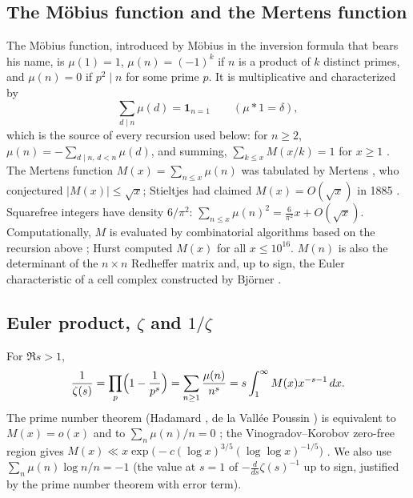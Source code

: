 \documentclass[11pt]{amsart}
\numberwithin{equation}{section}
\theoremstyle{plain}
\theoremstyle{definition}
\theoremstyle{remark}
\begin{document}
\subsection{The Möbius function and the Mertens function}
\label{subsec:intro-mobius}
The Möbius function, introduced by Möbius \cite{Mobius1832} in the
inversion formula that bears his name, is $\mu(1)=1$, $\mu(n)=(-1)^k$ if $n$
is a product of $k$ distinct primes, and $\mu(n)=0$ if $p^2\mid n$ for some
prime $p$. It is multiplicative and characterized by
\[
\sum_{d\mid n}\mu(d)=\mathbf 1_{n=1}\qquad(\mu*1=\delta),
\]
which is the source of every recursion used below: for $n\ge2$,
$\mu(n)=-\sum_{d\mid n,\,d<n}\mu(d)$, and summing,
$\sum_{k\le x}M(x/k)=1$ for $x\ge1$ \cite[\S3.2]{MontgomeryVaughan2007}.
The Mertens function $M(x)=\sum_{n\le x}\mu(n)$ was tabulated by Mertens
\cite{Mertens1897}, who conjectured $|M(x)|\le\sqrt x$; Stieltjes had
claimed $M(x)=O(\sqrt x)$ in 1885 \cite{Stieltjes1905}. Squarefree integers
have density $6/\pi^2$: $\sum_{n\le x}\mu(n)^2=\frac6{\pi^2}x+O(\sqrt x)$.
Computationally, $M$ is evaluated by combinatorial algorithms based on the
recursion above \cite{DelegliseRivat1996,HT23}; Hurst \cite{Hurst18}
computed $M(x)$ for all $x\le10^{16}$. $M(n)$ is also the determinant of the
$n\times n$ Redheffer matrix \cite{Redheffer1977} and, up to sign, the
Euler characteristic of a cell complex constructed by Björner
\cite{Bjorner2011}.

\subsection{Euler product, $\zeta$ and $1/\zeta$}
For $\Re s>1$,
\[
\frac1{\zeta(s)}=\prod_p\Bigl(1-\frac1{p^s}\Bigr)=\sum_{n\ge1}\frac{\mu(n)}{n^s}
=s\int_1^\infty M(x)x^{-s-1}\,dx .
\]
The prime number theorem (Hadamard \cite{Hadamard1896}, de la Vallée
Poussin \cite{dlVP1896}) is equivalent to $M(x)=o(x)$ \cite{Landau1911}
and to $\sum_{n}\mu(n)/n=0$ \cite{vonMangoldt1897}; the Vinogradov--Korobov
zero-free region gives
$M(x)\ll x\exp\bigl(-c(\log x)^{3/5}(\log\log x)^{-1/5}\bigr)$
\cite{Walfisz1963,Ford2002}. We also use
$\sum_n\mu(n)\log n/n=-1$ (the value at $s=1$ of $-\frac{d}{ds}\zeta(s)^{-1}$
up to sign, justified by the prime number theorem with error term).
\end{document}

